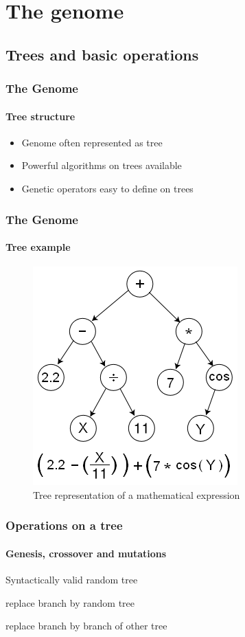 \documentclass{beamer}
\begin{document}


\section{The genome} %
\label{sg:sec:the_genome}

\subsection{Trees and basic operations} %
\label{sg:ssub:trees_and_basic_operations}

\begin{frame}
	\frametitle{The Genome}
	\framesubtitle{Tree structure}
	\begin{itemize}
		\item<1-> Genome often represented as tree
		\item<2-> Powerful algorithms on trees available
		\item<3-> Genetic operators easy to define on trees
	\end{itemize}
\end{frame}

\begin{frame}
	\frametitle{The Genome}
	\framesubtitle{Tree example}
	\begin{figure}[h]
		\centering
			\includegraphics[width=0.6\textheight]{images/Genetic_Program_Tree.png}
		\caption{Tree representation of a mathematical expression}
		\label{sg:fig:images_Genetic_Program_Tree}
	\end{figure}
\end{frame}

\begin{frame}
	\frametitle{Operations on a tree}
	\framesubtitle{Genesis, crossover and mutations}
	\begin{description}
		\item<1->[Genesis] Syntactically valid random tree
		\item<2->[Mutation] replace branch by random tree
		\item<3->[Crossover] replace branch by branch of other tree
	\end{description}
\end{frame}
\end{document}
